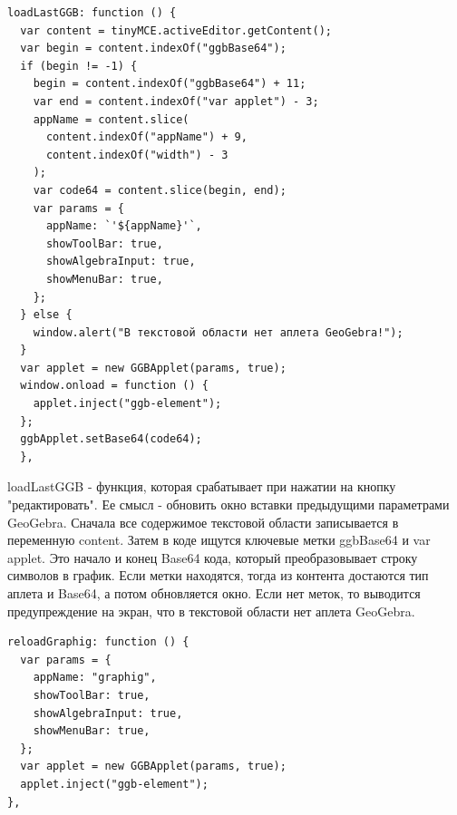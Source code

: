 \documentclass[14pt,Diplom]{diplomwork}
\begin{document}
\begin{verbatim}
loadLastGGB: function () {
  var content = tinyMCE.activeEditor.getContent();
  var begin = content.indexOf("ggbBase64");
  if (begin != -1) {
    begin = content.indexOf("ggbBase64") + 11;
    var end = content.indexOf("var applet") - 3;
    appName = content.slice(
      content.indexOf("appName") + 9,
      content.indexOf("width") - 3
    );
    var code64 = content.slice(begin, end);
    var params = {
      appName: `'${appName}'`,
      showToolBar: true,
      showAlgebraInput: true,
      showMenuBar: true,
    };
  } else {
    window.alert("В текстовой области нет аплета GeoGebra!");
  }
  var applet = new GGBApplet(params, true);
  window.onload = function () {
    applet.inject("ggb-element");
  };
  ggbApplet.setBase64(code64);
  },
\end{verbatim}
loadLastGGB - функция, которая срабатывает при нажатии на кнопку "редактировать". Ее смысл - обновить окно вставки предыдущими параметрами GeoGebra. Сначала все содержимое текстовой области записывается в переменную content. Затем в коде ищутся ключевые метки ggbBase64 и var applet. Это начало и конец Base64 кода, который преобразовывает строку символов в график. Если метки находятся, тогда из контента достаются тип аплета и Base64, а потом обновляется окно. Если нет меток, то выводится предупреждение на экран, что в текстовой области нет аплета GeoGebra.

\begin{verbatim}
reloadGraphig: function () {
  var params = {
    appName: "graphig",
    showToolBar: true,
    showAlgebraInput: true,
    showMenuBar: true,
  };
  var applet = new GGBApplet(params, true);
  applet.inject("ggb-element");
},
\end{verbatim}

\newpage
\end{document}
